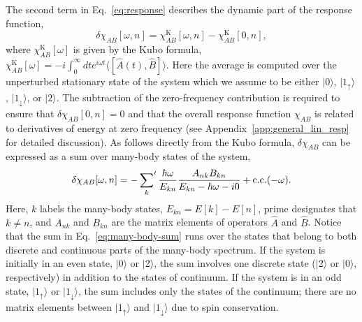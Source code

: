 \documentclass[aps,reprint,longbibliography, prb]{revtex4-2}
\begin{document}
The second term in Eq.~\eqref{eq:response} describes the dynamic part of the response function,
\begin{equation}
\label{eq:delta-chi}
\delta\chi_{AB}[\omega,n]=\chi_{AB}^\mathrm{K}[\omega,n]-\chi_{AB}^\mathrm{K}[0,n],
\end{equation}
where
$\chi_{AB}^\mathrm{K}[\omega]$ is given by the Kubo formula, $\chi_{AB}^\mathrm{K}[\omega] = -i \int_0^\infty dt e^{i\omega t} \langle [\hat{A}(t),\hat{B}]\rangle$. Here the average is computed over the unperturbed stationary state of the system which we assume to be either $|0\rangle$, $|1_\uparrow\rangle$, $|1_\downarrow\rangle$, or $|2\rangle$. The subtraction of the zero-frequency contribution is required to ensure that $\delta\chi_{AB}[0,n]=0$ and that the overall response function $\chi_{AB}$ is related to derivatives of energy at zero frequency (see Appendix~\ref{app:general_lin_resp} for detailed discussion). As follows directly from the Kubo formula, $\delta\chi_{AB}$ can be expressed as a sum over many-body states of the system,
\begin{equation}
    \label{eq:many-body-sum}
    \delta\chi_{AB}[\omega,n] = -\sideset{}{'}\sum_{k} \frac{\hbar\omega}{E_{kn}}\frac{A_{nk}B_{kn}}{E_{kn}-\hbar\omega-i0} + \mathrm{c.c.}(-\omega).
\end{equation}
Here, $k$ labels the many-body states, $E_{kn} = E[k] - E[n]$, prime designates that $k \neq n$, and $A_{nk}$ and $B_{kn}$ are the matrix elements of operators $\hat{A}$ and $\hat{B}$. Notice that the sum in Eq.~\eqref{eq:many-body-sum} runs over the states that belong to both discrete and continuous parts of the many-body spectrum. If the system is initially in an even state, $|0\rangle$ or $|2\rangle$, the sum involves one discrete state ($|2\rangle$ or $|0\rangle$, respectively) in addition to the states of continuum. If the system is in an odd state, $|1_\uparrow\rangle$ or $|1_\downarrow\rangle$, the sum includes only the states of the continuum; there are no matrix elements between $|1_\uparrow\rangle$ and $|1_\downarrow\rangle$ due to spin conservation.
\end{document}
